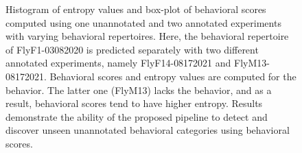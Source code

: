 \begin{figure}[htb!]
\begin{subfigure}[b]{0.445\linewidth}
	\end{subfigure}%
	\caption[Histogram of entropy values and box-plot of the behavioral scores computed using one unannotated and two annotated experiments with varying behavioral repertoires.]{Histogram of entropy values and box-plot of behavioral scores computed using one unannotated and two annotated experiments with varying behavioral repertoires.
		Here, the behavioral repertoire of FlyF1-03082020 is predicted separately with two different annotated experiments, namely FlyF14-08172021 and FlyM13-08172021.
		Behavioral scores and entropy values are computed for the \HaltereSwitch behavior.
		The latter one (FlyM13) lacks the \HaltereSwitch behavior, and as a result, behavioral scores tend to have higher entropy.
		Results demonstrate the ability of the proposed pipeline to detect and discover unseen unannotated behavioral categories using behavioral scores.\label{figure:repertoire-difference}}
\end{figure}

